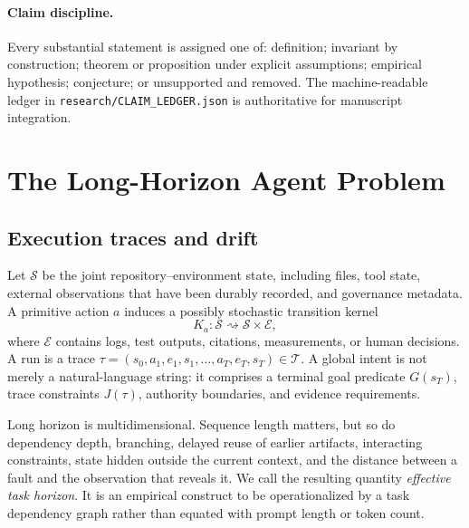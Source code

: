 \documentclass[11pt]{article}
\newcommand{\State}{\mathcal S}
\newcommand{\Trace}{\mathcal T}
\newcommand{\Evidence}{\mathcal E}
\begin{document}
\paragraph{Claim discipline.} Every substantial statement is assigned one of: definition; invariant by construction; theorem or proposition under explicit assumptions; empirical hypothesis; conjecture; or unsupported and removed. The machine-readable ledger in \texttt{research/CLAIM\_LEDGER.json} is authoritative for manuscript integration.

\section{The Long-Horizon Agent Problem}
\subsection{Execution traces and drift}
Let $\State$ be the joint repository--environment state, including files, tool state, external observations that have been durably recorded, and governance metadata. A primitive action $a$ induces a possibly stochastic transition kernel
\[
K_a : \State \rightsquigarrow \State\times\Evidence,
\]
where $\Evidence$ contains logs, test outputs, citations, measurements, or human decisions. A run is a trace $\tau=(s_0,a_1,e_1,s_1,\ldots,a_T,e_T,s_T)\in\Trace$. A global intent is not merely a natural-language string: it comprises a terminal goal predicate $G(s_T)$, trace constraints $J(\tau)$, authority boundaries, and evidence requirements.

Long horizon is multidimensional. Sequence length matters, but so do dependency depth, branching, delayed reuse of earlier artifacts, interacting constraints, state hidden outside the current context, and the distance between a fault and the observation that reveals it. We call the resulting quantity \emph{effective task horizon}. It is an empirical construct to be operationalized by a task dependency graph rather than equated with prompt length or token count.
\end{document}
